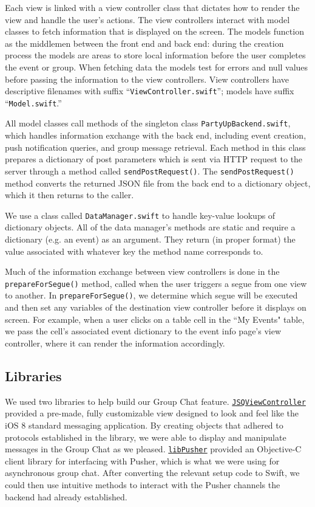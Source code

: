 \documentclass[12pt]{article}
\begin{document}
Each view is linked with a view controller class
that dictates how to render the view and handle the user's actions. 
The view controllers interact with model classes to fetch information 
that is displayed on the screen. 
The models function as the middlemen between the front end and back end: 
during the creation process the models are areas to store local information 
before the user completes the event or group. When fetching data the models 
test for errors and null values before passing the information to the view controllers.
View controllers have descriptive filenames with suffix ``\texttt{ViewController.swift}''; 
models have suffix ``\texttt{Model.swift}.''

All model classes call methods of the singleton class \texttt{PartyUpBackend.swift},
which handles information exchange with the back end, including event creation,
push notification queries, and group message retrieval.
Each method in this class prepares a dictionary of post parameters which is
sent via HTTP request to the server through a method called \texttt{sendPostRequest()}.
The \texttt{sendPostRequest()} method converts the returned JSON file from the back end to a dictionary object,
which it then returns to the caller.

We use a class called \texttt{DataManager.swift} to handle key-value lookups of dictionary objects.
All of the data manager's methods are static and require a dictionary (e.g. an event) as an argument.
They return (in proper format) the value associated with whatever key the method name corresponds to. 

Much of the information exchange between view controllers is done in the \texttt{prepareForSegue()} method,
called when the user triggers a segue from one view to another. In \texttt{prepareForSegue()},
we determine which segue will be executed and then set any variables of the destination view
controller before it displays on screen.
For example, when a user clicks on a table cell in the ``My Events" table,
we pass the cell's associated event dictionary to the event info page's view controller,
where it can render the information accordingly. 

\subsection{Libraries}
We used two libraries to help build our Group Chat feature.
\href{https://github.com/jessesquires/JSQMessagesViewController}{\texttt{JSQViewController}} 
provided a pre-made, fully customizable view designed to look and feel like the iOS 8 standard
messaging application.
By creating objects that adhered to protocols established in the library, we were able to display
and manipulate messages in the Group Chat as we pleased.
\href{https://github.com/lukeredpath/libPusher}{\texttt{libPusher}} provided an Objective-C
client library for interfacing with Pusher, which is what we were using for asynchronous group
chat. After converting the relevant setup code to Swift, we could then use intuitive methods to
interact with the Pusher channels the backend had already established.
\end{document}
